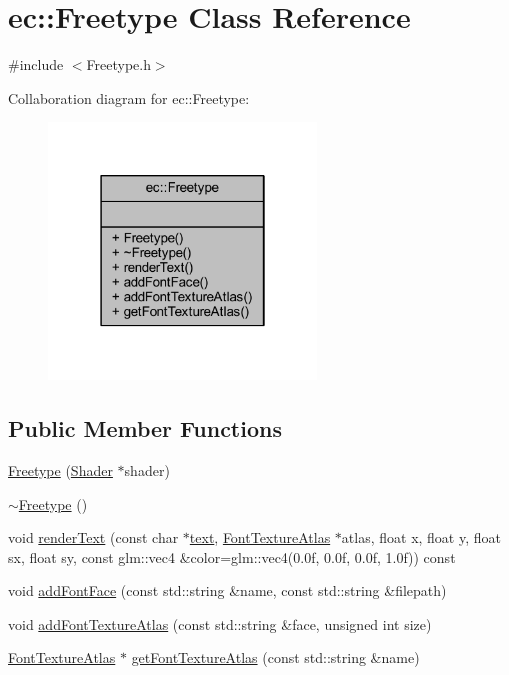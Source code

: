 \hypertarget{classec_1_1_freetype}{}\section{ec\+:\+:Freetype Class Reference}
\label{classec_1_1_freetype}


{\ttfamily \#include $<$Freetype.\+h$>$}



Collaboration diagram for ec\+:\+:Freetype\+:\nopagebreak
\begin{figure}[H]
\begin{center}
\leavevmode
\includegraphics[width=202pt]{classec_1_1_freetype__coll__graph}
\end{center}
\end{figure}
\subsection*{Public Member Functions}
\begin{DoxyCompactItemize}
\item 
\mbox{\hyperlink{classec_1_1_freetype_a77da5cdd8b053a5fea7c5ffd78c39418}{Freetype}} (\mbox{\hyperlink{classec_1_1_shader}{Shader}} $\ast$shader)
\item 
\mbox{\hyperlink{classec_1_1_freetype_a35e8fad09705600cdd263ed3781d299b}{$\sim$\+Freetype}} ()
\item 
void \mbox{\hyperlink{classec_1_1_freetype_afef1f61fa4bd8114825c66ac93d3e6bf}{render\+Text}} (const char $\ast$\mbox{\hyperlink{namespaceec_a0bdee24285d69deca899e166b29c0150}{text}}, \mbox{\hyperlink{classec_1_1_font_texture_atlas}{Font\+Texture\+Atlas}} $\ast$atlas, float x, float y, float sx, float sy, const glm\+::vec4 \&color=glm\+::vec4(0.\+0f, 0.\+0f, 0.\+0f, 1.\+0f)) const
\item 
void \mbox{\hyperlink{classec_1_1_freetype_a7a10e5515342b70588f76328ac83826d}{add\+Font\+Face}} (const std\+::string \&name, const std\+::string \&filepath)
\item 
void \mbox{\hyperlink{classec_1_1_freetype_a1be4b69e2d57689533ddaabdc9042d51}{add\+Font\+Texture\+Atlas}} (const std\+::string \&face, unsigned int size)
\item 
\mbox{\hyperlink{classec_1_1_font_texture_atlas}{Font\+Texture\+Atlas}} $\ast$ \mbox{\hyperlink{classec_1_1_freetype_a3e0a8937ec0ceb33495598da59b2c4f3}{get\+Font\+Texture\+Atlas}} (const std\+::string \&name)
\end{DoxyCompactItemize}


